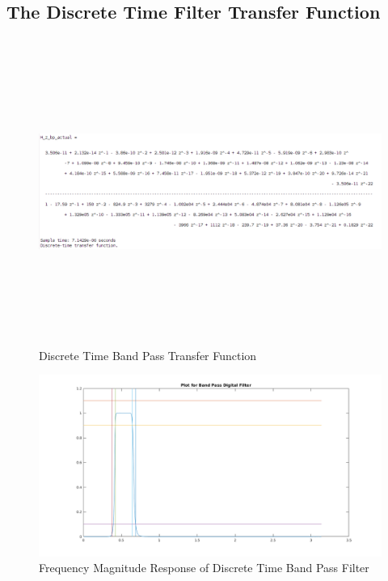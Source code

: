 \documentclass[22pt]{article}
\begin{document}
\subsection{The Discrete Time Filter Transfer Function}
\begin{figure}[H]
  \centering
  \includegraphics[width=1.2\textwidth,height=10cm]{images/Discrete_bp_tf}
  \caption{Discrete Time Band Pass Transfer Function}
  \label{fig:5}
\end{figure}
\begin{figure}[H]
  \centering
  \includegraphics[scale=0.5]{images/Freqz_digital_bp}
  \caption{Frequency Magnitude Response of Discrete Time Band Pass Filter}
  \label{fig:6}
\end{figure}
\end{document}
